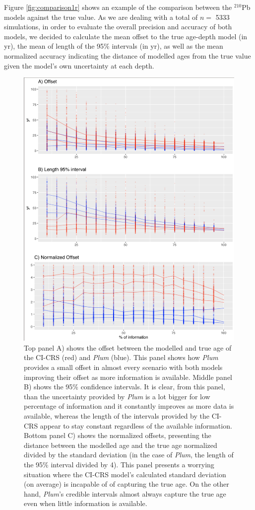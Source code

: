 \documentclass [10pt] {article}
\begin{document}
Figure \ref{fig:comparison1r} shows an example of the comparison between the $^{210}$Pb models against the true value. 
As we are dealing with a total of $n =$ 5333 simulations, in order to evaluate the overall precision and accuracy of both models, we decided to calculate the mean offset to the true age-depth model (in yr), the mean of length of the 95\% intervals (in yr), as well as the mean normalized accuracy indicating the distance of modelled ages from the true value given the model's own uncertainty at each depth.  

\begin{figure}[!]
 \centering
  \includegraphics[width=.75\linewidth]{AccPrec.png}
	\caption{Top panel A) shows the offset between the modelled and true age of the CI-CRS (red) and \textit{Plum} (blue). This panel shows how \textit{Plum} provides a small offset in almost every scenario with both models improving their offset as more information is available. Middle panel B) shows the 95\% confidence intervals. It is clear, from this panel, than the uncertainty provided by \textit{Plum} is a lot bigger for low percentage of information and it constantly improves as more data is available, whereas the length of the intervals provided by the CI-CRS appear to stay constant regardless of the available information. Bottom panel C) shows the normalized offsets, presenting the distance between the modelled age and the true age normalized divided by the standard deviation (in the case of \textit{Plum}, the length of the 95\% interval divided by 4). This panel presents a worrying situation where the CI-CRS model's calculated standard deviation (on average) is incapable of of capturing the true age. On the other hand, \textit{Plum}'s credible intervals almost always capture the true age even when little information is available.}
  \label{fig:accpre}
\end{figure}
\end{document}
